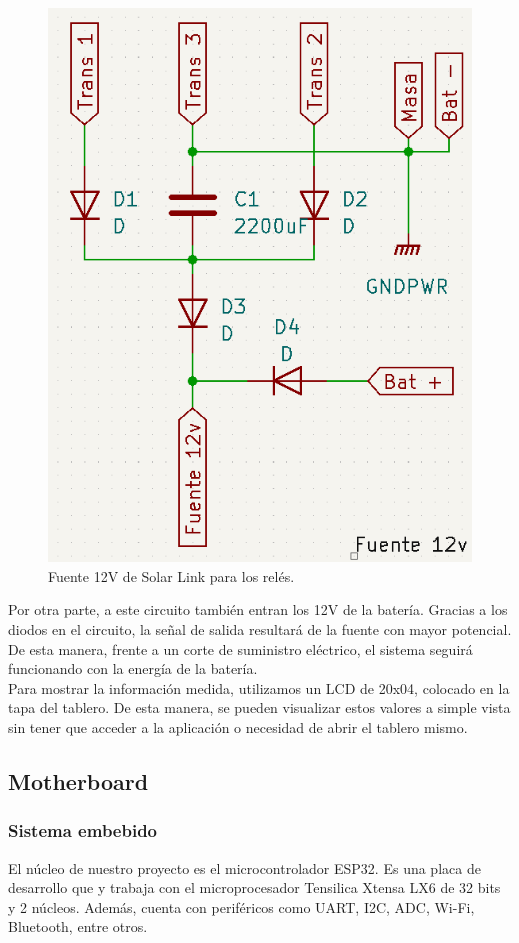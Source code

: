 \begin{figure}[H]
    \centering
    \includegraphics[width=0.7\linewidth]{hardware/Screenshot_10.png}
    \caption{Fuente 12V de Solar Link para los relés.}
    \label{fig:Fuente 12v}
\end{figure}

Por otra parte, a este circuito también entran los 12V de la batería. Gracias a los diodos en el circuito, la señal de salida resultará de la fuente con mayor potencial. De esta manera, frente a un corte de suministro eléctrico, el sistema seguirá funcionando con la energía de la batería.\\

Para mostrar la información medida, utilizamos un LCD de 20x04, colocado en la tapa del tablero. De esta manera, se pueden visualizar estos valores a simple vista sin tener que acceder a la aplicación o necesidad de abrir el tablero mismo.\\

\subsection{Motherboard}

\subsubsection{Sistema embebido}

El núcleo de nuestro proyecto es el microcontrolador ESP32. Es una placa de desarrollo que y trabaja con el microprocesador Tensilica Xtensa LX6 de 32 bits y 2 núcleos. Además, cuenta con periféricos como UART, I2C, ADC, Wi-Fi, Bluetooth, entre otros.\\

